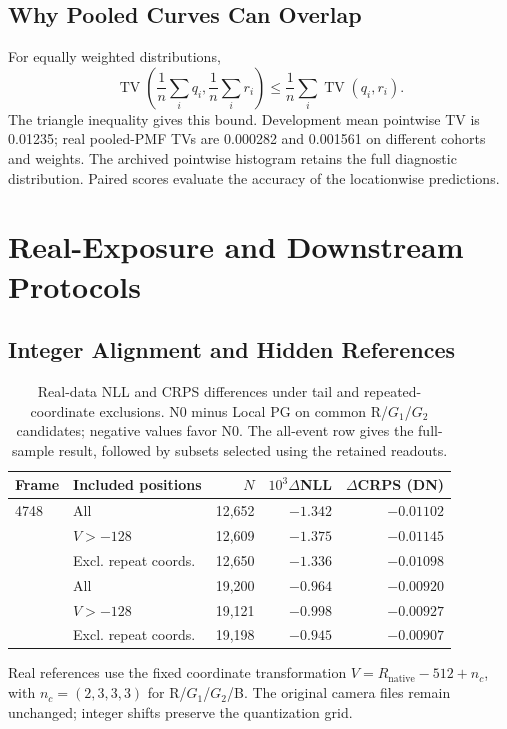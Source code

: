 \documentclass[10pt,twocolumn,journal]{IEEEtran}
\begin{document}
\subsection{Why Pooled Curves Can Overlap}
For equally weighted distributions,
\begin{equation}
\operatorname{TV}\!\left(\frac1n\sum_iq_i,\frac1n\sum_ir_i\right)
\leq\frac1n\sum_i\operatorname{TV}(q_i,r_i).
\end{equation}
The triangle inequality gives this bound. Development mean pointwise TV is 0.01235; real pooled-PMF TVs are 0.000282 and 0.001561 on different cohorts and weights. The archived pointwise histogram retains the full diagnostic distribution. Paired scores evaluate the accuracy of the locationwise predictions.

\section{Real-Exposure and Downstream Protocols}
\subsection{Integer Alignment and Hidden References}
\begin{table}[t]
\centering
\caption{Real-data NLL and CRPS differences under tail and repeated-coordinate exclusions. N0 minus Local PG on common R/$G_1$/$G_2$ candidates; negative values favor N0. The all-event row gives the full-sample result, followed by subsets selected using the retained readouts.}
\label{tab:real_robust}
\footnotesize
\setlength{\tabcolsep}{2.2pt}
\begin{tabular}{@{}llrrr@{}}
\toprule
Frame & Included positions & $N$ & $10^3\Delta$NLL & $\Delta$CRPS (DN)\\
\midrule
4748 & All & 12,652 & $-1.342$ & $-0.01102$\\
 & $V>-128$ & 12,609 & $-1.375$ & $-0.01145$\\
 & Excl. repeat coords. & 12,650 & $-1.336$ & $-0.01098$\\
\addlinespace[2pt]
4749 & All & 19,200 & $-0.964$ & $-0.00920$\\
 & $V>-128$ & 19,121 & $-0.998$ & $-0.00927$\\
 & Excl. repeat coords. & 19,198 & $-0.945$ & $-0.00907$\\
\bottomrule
\end{tabular}
\end{table}

Real references use the fixed coordinate transformation $V=R_{\mathrm{native}}-512+n_c$, with $n_c=(2,3,3,3)$ for R/$G_1$/$G_2$/B. The original camera files remain unchanged; integer shifts preserve the quantization grid.
\end{document}

